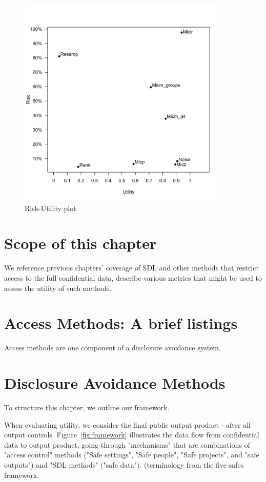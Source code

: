 \documentclass[12pt]{article}
\begin{document}
\begin{figure}
\begin{center}
\includegraphics[width=4in]{R_U_plot.pdf}
\end{center}
\caption{Risk-Utility plot}
\label{fig.ruplot}
\end{figure}


\section{Scope of this chapter}\label{sec:scope}

We reference previous chapters' coverage of \gls{SDL} and other methods that restrict access to the full confidential data, describe various metrics that might be used to assess the utility of such methods.

\section{Access Methods: A brief listings}\label{sec:access_methods}

Access methods are one component of a disclosure avoidance system.

\section{Disclosure Avoidance Methods}\label{sec:da_methods}

To structure this chapter, we outline our framework. 

When evaluating utility, we consider the final public output product - after all output controls. Figure~\ref{fig:framework} illustrates the data flow from confidential data to output product, going through "mechanisms" that are combinations of "access control" methods ("Safe settings", "Safe people", "Safe projects", and "safe outputs") and "SDL methods" ("safe data"). (terminology from the five safes framework.
\end{document}
